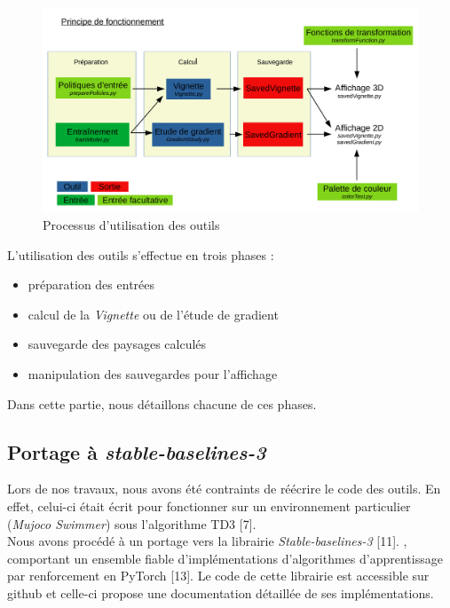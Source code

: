 \documentclass[12pt]{article}
\begin{document}
\begin{figure}[htp]
    \centering
    \includegraphics[width=18cm]{Images/Principe}
    \caption{Processus d'utilisation des outils}
    \label{fig:principe}
\end{figure}

\newpage
L'utilisation des outils s'effectue en trois phases : 
\begin{itemize}
	\setlength{\itemindent}{4em}
	\item préparation des entrées
	\item calcul de la \emph{Vignette} ou de l'étude de gradient
	\item sauvegarde des paysages calculés
	\item manipulation des sauvegardes pour l'affichage
\end{itemize}

Dans cette partie, nous détaillons chacune de ces phases.

\subsection*{Portage à \emph{stable-baselines-3}}

Lors de nos travaux, nous avons été contraints de réécrire le code des outils. En effet, celui-ci était écrit pour fonctionner sur un environnement particulier (\emph{Mujoco Swimmer}) sous l’algorithme TD3 [7]. \\

Nous avons procédé à un portage vers la librairie \emph{Stable-baselines-3} [11].
, comportant un ensemble fiable d’implémentations d’algorithmes d’apprentissage par renforcement en PyTorch [13]. Le code de cette librairie est accessible sur github et celle-ci propose une documentation détaillée de ses implémentations. \\
\end{document}
